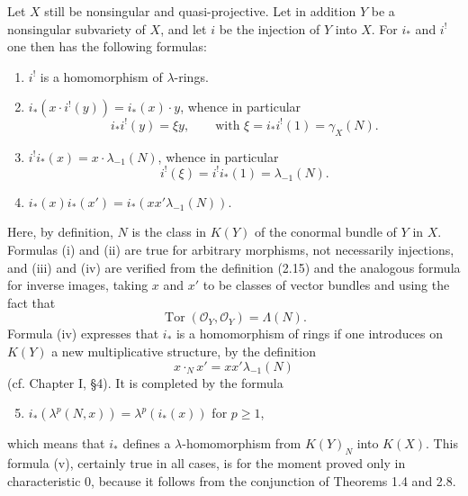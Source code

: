 \documentclass[11pt]{article}
\newcommand{\Tor}{\operatorname{Tor}}
\providecommand{\Tor}{\operatorname{Tor}}
\providecommand{\cO}{\mathcal O}
\begin{document}
Let $X$ still be nonsingular and quasi-projective. Let in addition $Y$ be a nonsingular subvariety of $X$, and let $i$ be the injection of $Y$ into $X$. For $i_*$ and $i^!$ one then has the following formulas:
\begin{enumerate}[label=(\roman*)]
\item $i^!$ is a homomorphism of $\lambda$-rings.
\item $i_*(x\cdot i^!(y))=i_*(x)\cdot y$, whence in particular
\[
 i_*i^!(y)=\xi y,
\qquad \text{with }\xi=i_*i^!(1)=\gamma_X(N).
\]
\item $i^!i_*(x)=x\cdot\lambda_{-1}(N)$, whence in particular
\[
 i^!(\xi)=i^!i_*(1)=\lambda_{-1}(N).
\]
\item $i_*(x)i_*(x')=i_*(xx'\lambda_{-1}(N))$.
\end{enumerate}
Here, by definition, $N$ is the class in $K(Y)$ of the conormal bundle of $Y$ in $X$. Formulas (i) and (ii) are true for arbitrary morphisms, not necessarily injections, and (iii) and (iv) are verified from the definition (2.15) and the analogous formula for inverse images, taking $x$ and $x'$ to be classes of vector bundles and using the fact that
\begin{equation}\tag{2.36}
 \Tor(\cO_Y,\cO_Y)=\Lambda(N).
\end{equation}
Formula (iv) expresses that $i_*$ is a homomorphism of rings if one introduces on $K(Y)$ a new multiplicative structure, by the definition
\[
 x\cdot_N x'=xx'\lambda_{-1}(N)
\]
(cf. Chapter I, \S 4). It is completed by the formula
\begin{enumerate}[label=(\roman*)]
\setcounter{enumi}{4}
\item $i_*(\lambda^p(N,x))=\lambda^p(i_*(x))$ for $p\geq 1$,
\end{enumerate}
which means that $i_*$ defines a $\lambda$-homomorphism from $K(Y)_N$ into $K(X)$. This formula (v), certainly true in all cases, is for the moment proved only in characteristic $0$, because it follows from the conjunction of Theorems 1.4 and 2.8.
\end{document}
